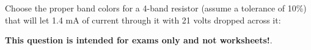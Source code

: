 

Choose the proper band colors for a 4-band resistor (assume a tolerance of 10\%) that will let 1.4 mA of current through it with 21 volts dropped across it:

\vskip 10pt

\underbar{\hskip 30pt} \hskip 30pt  \underbar{\hskip 30pt} \hskip 30pt  \underbar{\hskip 30pt} \hskip 30pt \underbar{\hskip 30pt}







 \hskip 30pt   \hskip 30pt   \hskip 30pt 







{\bf This question is intended for exams only and not worksheets!}.



